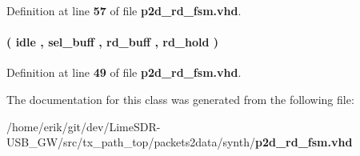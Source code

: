 Definition at line {\bf 57} of file {\bf p2d\+\_\+rd\+\_\+fsm.\+vhd}.

\paragraph[{state\+\_\+type}]{ {\bfseries \textcolor{vhdlchar}{(}\textcolor{vhdlchar}{ }\textcolor{vhdlchar}{idle}\textcolor{vhdlchar}{ }\textcolor{vhdlchar}{,}\textcolor{vhdlchar}{ }\textcolor{vhdlchar}{sel\+\_\+buff}\textcolor{vhdlchar}{ }\textcolor{vhdlchar}{,}\textcolor{vhdlchar}{ }\textcolor{vhdlchar}{rd\+\_\+buff}\textcolor{vhdlchar}{ }\textcolor{vhdlchar}{,}\textcolor{vhdlchar}{ }\textcolor{vhdlchar}{rd\+\_\+hold}\textcolor{vhdlchar}{ }\textcolor{vhdlchar}{)}\textcolor{vhdlchar}{ }} \hspace{0.3cm}{\ttfamily [Type]}}\label{classp2d__rd__fsm_1_1arch_a566d154a26c7124c56fc4b75d1713e6f}


Definition at line {\bf 49} of file {\bf p2d\+\_\+rd\+\_\+fsm.\+vhd}.



The documentation for this class was generated from the following file\+:\begin{DoxyCompactItemize}
\item 
/home/erik/git/dev/\+Lime\+S\+D\+R-\/\+U\+S\+B\+\_\+\+G\+W/src/tx\+\_\+path\+\_\+top/packets2data/synth/{\bf p2d\+\_\+rd\+\_\+fsm.\+vhd}\end{DoxyCompactItemize}

